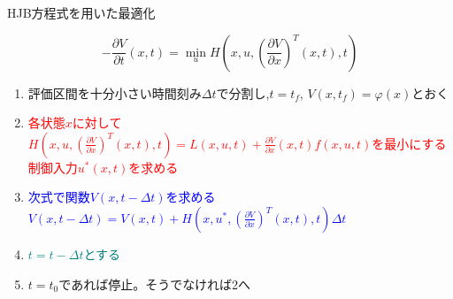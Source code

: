 \documentclass[twocolumn, dvipdfmx,12pt]{beamer}
\begin{document}
    \begin{frame}{HJB方程式を用いた最適化}
        \fontsize{11.8pt}{8.8pt}\selectfont

        \begin{screen}
            \begin{equation*}
                -\frac{\partial V}{\partial t}\left(x,t\right) = \min _u H\left(x, u, \left( \frac{\partial V}{\partial x} \right)^T\left(x, t\right), t \right)
            \end{equation*}
        \end{screen}
        
        \begin{enumerate}
            \item 評価区間を十分小さい時間刻み$\Delta t$で分割し,$t=t_f$, $V(x, t_f)=\varphi (x)$とおく
            \item \textcolor{red}{各状態$x$に対して$H\left(x, u, \left( \frac{\partial V}{\partial x} \right)^T\left(x, t\right), t \right) = L(x, u, t) + \frac{\partial V}{\partial x}\left(x, t\right)f\left(x, u, t\right)$を最小にする制御入力$u^*(x, t)$を求める}
            \item \textcolor{blue}{次式で関数$V(x, t-\Delta t)$を求める$V(x, t-\Delta t)=V(x, t)+H\left(x, u^*, \left( \frac{\partial V}{\partial x} \right)^T\left(x, t\right), t \right)\Delta t$}
            \item \textcolor{teal}{$t=t-\Delta t$とする}
            \item $t=t_0$であれば停止。そうでなければ2へ
        \end{enumerate}
    \end{frame}
\end{document}
